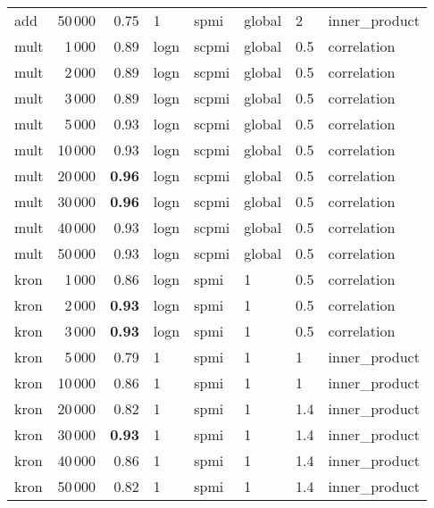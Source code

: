\begin{tabular}{lrrlllll}
     add &           50\,000 &       0.75 &     1 &   spmi &  global &    2 &  inner\_product \\ \addlinespace
    mult &            1\,000 &       0.89 &  logn &  scpmi &  global &  0.5 &    correlation \\
    mult &            2\,000 &       0.89 &  logn &  scpmi &  global &  0.5 &    correlation \\
    mult &            3\,000 &       0.89 &  logn &  scpmi &  global &  0.5 &    correlation \\
    mult &            5\,000 &       0.93 &  logn &  scpmi &  global &  0.5 &    correlation \\
    mult &           10\,000 &       0.93 &  logn &  scpmi &  global &  0.5 &    correlation \\
    mult &           20\,000 &       \textbf{0.96} &  logn &  scpmi &  global &  0.5 &    correlation \\
    mult &           30\,000 &       \textbf{0.96} &  logn &  scpmi &  global &  0.5 &    correlation \\
    mult &           40\,000 &       0.93 &  logn &  scpmi &  global &  0.5 &    correlation \\
    mult &           50\,000 &       0.93 &  logn &  scpmi &  global &  0.5 &    correlation \\ \addlinespace
    kron &            1\,000 &       0.86 &  logn &   spmi &       1 &  0.5 &    correlation \\
    kron &            2\,000 &       \textbf{0.93} &  logn &   spmi &       1 &  0.5 &    correlation \\
    kron &            3\,000 &       \textbf{0.93} &  logn &   spmi &       1 &  0.5 &    correlation \\
    kron &            5\,000 &       0.79 &     1 &   spmi &       1 &    1 &  inner\_product \\
    kron &           10\,000 &       0.86 &     1 &   spmi &       1 &    1 &  inner\_product \\
    kron &           20\,000 &       0.82 &     1 &   spmi &       1 &  1.4 &  inner\_product \\
    kron &           30\,000 &       \textbf{0.93} &     1 &   spmi &       1 &  1.4 &  inner\_product \\
    kron &           40\,000 &       0.86 &     1 &   spmi &       1 &  1.4 &  inner\_product \\
    kron &           50\,000 &       0.82 &     1 &   spmi &       1 &  1.4 &  inner\_product \\
\bottomrule
\end{tabular}
